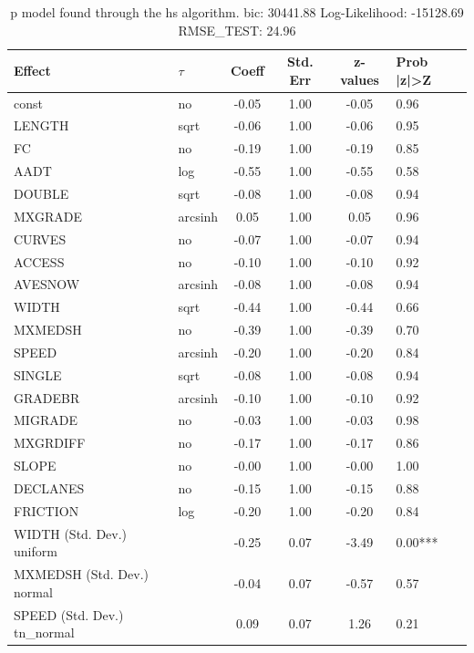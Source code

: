 \begin{table}
	\caption{p model found through the hs algorithm. bic: 30441.88 Log-Likelihood: -15128.69 RMSE_TEST: 24.96}
	\begin{center}
		\begin{tabular}{|l|l|c|c|c|l|}
			\hline
			Effect & $\tau$ & Coeff & Std. Err & z-values & Prob |z|>Z \\
			\hline
			const & no & -0.05 & 1.00 & -0.05 & 0.96 \\
			\hline
			LENGTH & sqrt & -0.06 & 1.00 & -0.06 & 0.95 \\
			\hline
			FC & no & -0.19 & 1.00 & -0.19 & 0.85 \\
			\hline
			AADT & log & -0.55 & 1.00 & -0.55 & 0.58 \\
			\hline
			DOUBLE & sqrt & -0.08 & 1.00 & -0.08 & 0.94 \\
			\hline
			MXGRADE & arcsinh & 0.05 & 1.00 & 0.05 & 0.96 \\
			\hline
			CURVES & no & -0.07 & 1.00 & -0.07 & 0.94 \\
			\hline
			ACCESS & no & -0.10 & 1.00 & -0.10 & 0.92 \\
			\hline
			AVESNOW & arcsinh & -0.08 & 1.00 & -0.08 & 0.94 \\
			\hline
			WIDTH & sqrt & -0.44 & 1.00 & -0.44 & 0.66 \\
			\hline
			MXMEDSH & no & -0.39 & 1.00 & -0.39 & 0.70 \\
			\hline
			SPEED & arcsinh & -0.20 & 1.00 & -0.20 & 0.84 \\
			\hline
			SINGLE & sqrt & -0.08 & 1.00 & -0.08 & 0.94 \\
			\hline
			GRADEBR & arcsinh & -0.10 & 1.00 & -0.10 & 0.92 \\
			\hline
			MIGRADE & no & -0.03 & 1.00 & -0.03 & 0.98 \\
			\hline
			MXGRDIFF & no & -0.17 & 1.00 & -0.17 & 0.86 \\
			\hline
			SLOPE & no & -0.00 & 1.00 & -0.00 & 1.00 \\
			\hline
			DECLANES & no & -0.15 & 1.00 & -0.15 & 0.88 \\
			\hline
			FRICTION & log & -0.20 & 1.00 & -0.20 & 0.84 \\
			\hline
			WIDTH (Std. Dev.) uniform &  & -0.25 & 0.07 & -3.49 & 0.00*** \\
			\hline
			MXMEDSH (Std. Dev.) normal &  & -0.04 & 0.07 & -0.57 & 0.57 \\
			\hline
			SPEED (Std. Dev.) tn_normal &  & 0.09 & 0.07 & 1.26 & 0.21 \\

\end{tabular}
\end{center}
\end{table}
